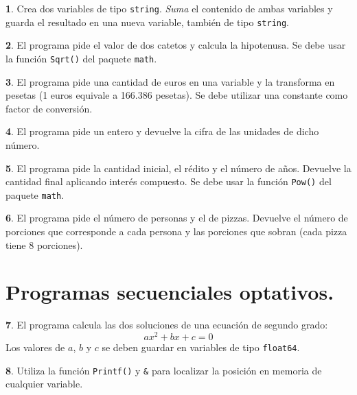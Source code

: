 \documentclass[a4paper, 12pt]{article}
\theoremstyle{definition}
\newtheorem{ejer}{}[section]
\begin{document}
\begin{ejer}
Crea dos variables de tipo \verb|string|. \textit{Suma} el contenido de ambas variables y guarda el resultado en una nueva variable, también de tipo \verb|string|.
\end{ejer}

\begin{ejer}
El programa pide el valor de dos catetos y calcula la hipotenusa. Se debe usar la función \verb|Sqrt()| del paquete \verb|math|.
\end{ejer}

\begin{ejer}
El programa pide una cantidad de euros en una variable y la transforma en pesetas (1 euros equivale a 166.386 pesetas). Se debe utilizar una constante como factor de conversión.
\end{ejer}

\begin{ejer}
El programa pide un entero y devuelve la cifra de las unidades de dicho número.
\end{ejer}

\begin{ejer}
El programa  pide  la cantidad inicial, el rédito y el número de años. Devuelve la cantidad final aplicando interés compuesto. Se debe usar la función \verb|Pow()| del paquete \verb|math|.
\end{ejer}

\begin{ejer}
El programa pide  el número de personas y el de pizzas. Devuelve el número de porciones que corresponde a cada persona y las porciones que sobran (cada pizza tiene 8 porciones).
\end{ejer}

\newpage

\section{Programas secuenciales optativos.}

\begin{ejer}
El programa calcula las dos soluciones de una ecuación de  segundo grado:
\[
ax^2+bx+c=0
\]
Los valores de $a$, $b$ y $c$ se deben guardar en variables de tipo \verb|float64|.
\end{ejer}

\begin{ejer}
Utiliza la función \verb|Printf()| y \verb|&| para localizar la posición en memoria de cualquier variable.
\end{ejer}
\end{document}
